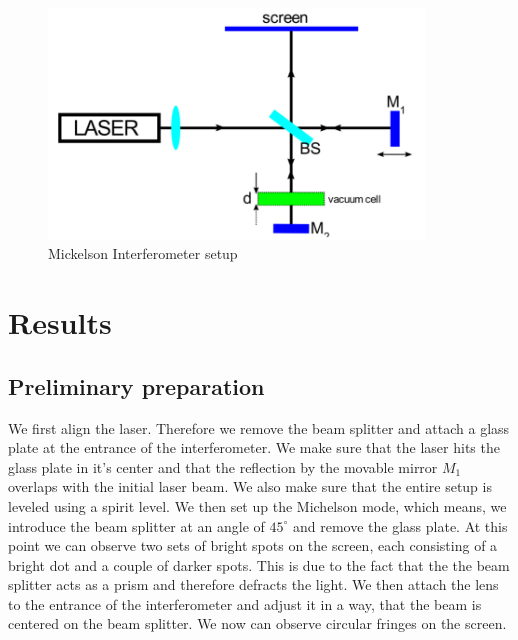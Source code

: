 \documentclass{scrartcl}
\begin{document}
\begin{figure}[h]
    \centering
    \includegraphics[width= 10cm]{Screenshot 2021-12-03 090339.png}
    \caption{Mickelson Interferometer setup}
    \label{fig:my_label}
\end{figure}

\section{Results}
\subsection{Preliminary preparation}
We first align the laser. Therefore we remove the beam splitter and attach a glass plate at the entrance of the interferometer. We make sure that the laser hits the glass plate in it's center and that the reflection by the movable mirror $M_1$ overlaps with the initial laser beam. We also make sure that the entire setup is leveled using a spirit level.
We then set up the Michelson mode, which means, we introduce the beam splitter at an angle of $45^\circ$ and remove the glass plate. At this point we can observe two sets of bright spots on the screen, each consisting of a bright dot and a couple of darker spots. This is due to the fact that the the beam splitter acts as a prism and therefore defracts the light. 
We then attach the lens to the entrance of the interferometer and adjust it in a way, that the beam is centered on the beam splitter. We now can observe circular fringes on the screen.

\end{document}

